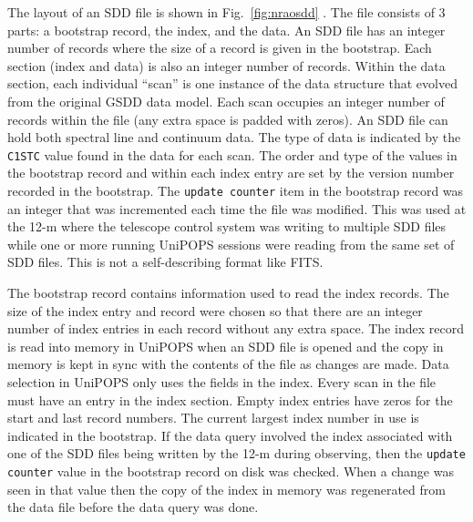 \documentclass[final,authoryear,5p,times,twocolumn]{elsarticle}
\begin{document}
The layout of an SDD file is shown in Fig.~\ref{fig:nraosdd}
\citep[see also][]{UNIPOPS}.  The file consists of 3 parts: a
bootstrap record, the index, and the data.  An SDD file has an integer
number of records where the size of a record is given in the
bootstrap.  Each section (index and data) is also an integer number of
records.  Within the data section, each individual ``scan'' is one
instance of the data structure that evolved from the original GSDD
data model.  Each scan occupies an integer number of records within
the file (any extra space is padded with zeros).  An SDD file can hold
both spectral line and continuum data.  The type of data is indicated
by the \texttt{C1STC} value found in the data for each scan. The order
and type of the values in the bootstrap record and within each index
entry are set by the version number recorded in the bootstrap.
The \texttt{update counter} item in the bootstrap record was an integer that
was incremented each time the file was modified.  This was used at the
12-m where the telescope control system was writing to multiple SDD files
while one or more running UniPOPS sessions were reading from the same
set of SDD files.  This is not a self-describing format like FITS.

The bootstrap record contains information used to read the index
records.  The size of the index entry and record were chosen so that
there are an integer number of index entries in each record without
any extra space.  The index record is read into memory in UniPOPS when
an SDD file is opened and the copy in memory is kept in sync with the
contents of the file as changes are made.  Data selection in UniPOPS
only uses the fields in the index.  Every scan in the file must have
an entry in the index section.  Empty index entries have zeros for the
start and last record numbers.  The current largest index number in
use is indicated in the bootstrap.  If the data query involved the
index associated with one of the SDD files being written by the
12-m during observing, then the \texttt{update counter} value in
the bootstrap record on disk was checked.  When a change was seen in that
value then the copy of the index in memory was regenerated from the
data file before the data query was done.
\end{document}

